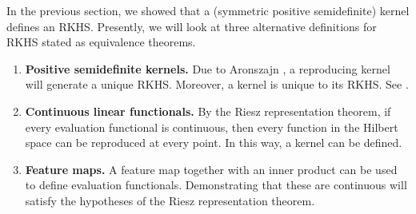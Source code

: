 In the previous section, we showed that a (symmetric positive semidefinite) kernel defines an RKHS.
Presently, we will look at three alternative definitions for RKHS stated as equivalence theorems.
\begin{enumerate}
    \item \textbf{Positive semidefinite kernels.}
    Due to Aronszajn \cite{aronszajn1950theory}, a reproducing kernel will generate a unique RKHS.
    Moreover, a kernel is unique to its RKHS.
    See .
    \item \textbf{Continuous linear functionals.}
    By the Riesz representation theorem, if every evaluation functional is continuous, then every function in the Hilbert space can be reproduced at every point.
    In this way, a kernel can be defined.
    \item \textbf{Feature maps.}
    A feature map together with an inner product can be used to define evaluation functionals.
    Demonstrating that these are continuous will satisfy the hypotheses of the Riesz representation theorem.
\end{enumerate}

